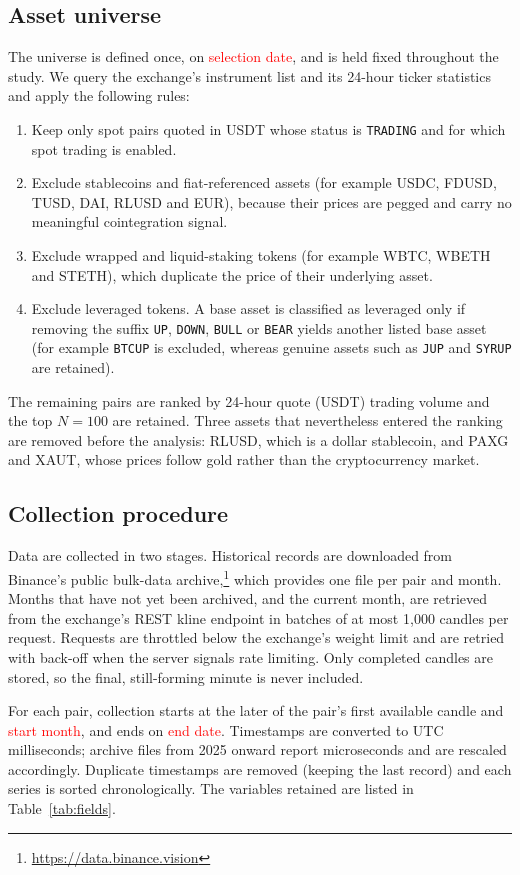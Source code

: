 \documentclass[10pt,a4paper,twocolumn]{article}
\newcommand{\TBD}[1]{\textcolor{red}{#1}}
\begin{document}
	\subsection{Asset universe}
	The universe is defined once, on \TBD{selection date}, and is held fixed throughout the study. We query the exchange's instrument list and its 24-hour ticker statistics and apply the following rules:
	\begin{enumerate}
		\item Keep only spot pairs quoted in USDT whose status is \texttt{TRADING} and for which spot trading is enabled.
		\item Exclude stablecoins and fiat-referenced assets (for example USDC, FDUSD, TUSD, DAI, RLUSD and EUR), because their prices are pegged and carry no meaningful cointegration signal.
		\item Exclude wrapped and liquid-staking tokens (for example WBTC, WBETH and STETH), which duplicate the price of their underlying asset.
		\item Exclude leveraged tokens. A base asset is classified as leveraged only if removing the suffix \texttt{UP}, \texttt{DOWN}, \texttt{BULL} or \texttt{BEAR} yields another listed base asset (for example \texttt{BTCUP} is excluded, whereas genuine assets such as \texttt{JUP} and \texttt{SYRUP} are retained).
	\end{enumerate}
	The remaining pairs are ranked by 24-hour quote (USDT) trading volume and the top $N = 100$ are retained. Three assets that nevertheless entered the ranking are removed before the analysis: RLUSD, which is a dollar stablecoin, and PAXG and XAUT, whose prices follow gold rather than the cryptocurrency market.
	
	\subsection{Collection procedure}
	Data are collected in two stages. Historical records are downloaded from Binance's public bulk-data archive,\footnote{\url{https://data.binance.vision}} which provides one file per pair and month. Months that have not yet been archived, and the current month, are retrieved from the exchange's REST kline endpoint in batches of at most 1{,}000 candles per request. Requests are throttled below the exchange's weight limit and are retried with back-off when the server signals rate limiting. Only completed candles are stored, so the final, still-forming minute is never included.
	
	For each pair, collection starts at the later of the pair's first available candle and \TBD{start month}, and ends on \TBD{end date}. Timestamps are converted to UTC milliseconds; archive files from 2025 onward report microseconds and are rescaled accordingly. Duplicate timestamps are removed (keeping the last record) and each series is sorted chronologically. The variables retained are listed in Table~\ref{tab:fields}.
	
\end{document}
